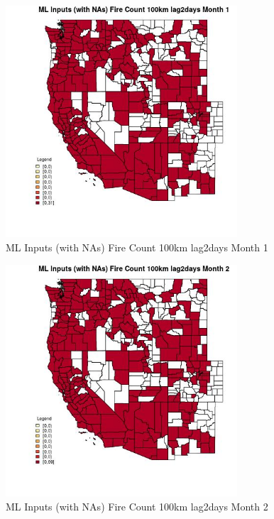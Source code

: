 \clearpage 

\begin{figure} 
\centering  
\includegraphics[width=0.77\textwidth]{Code_Outputs/Report_ML_input_PM25_Step4_part_e_de_duplicated_aves_compiled_2019-05-21wNAs_CountyFire_Count_100km_lag2daysmedianMonth1.jpg} 
\caption{\label{fig:Report_ML_input_PM25_Step4_part_e_de_duplicated_aves_compiled_2019-05-21wNAsCountyFire_Count_100km_lag2daysmedianMonth1}ML Inputs (with NAs) Fire Count 100km lag2days Month 1} 
\end{figure} 
 

\begin{figure} 
\centering  
\includegraphics[width=0.77\textwidth]{Code_Outputs/Report_ML_input_PM25_Step4_part_e_de_duplicated_aves_compiled_2019-05-21wNAs_CountyFire_Count_100km_lag2daysmedianMonth2.jpg} 
\caption{\label{fig:Report_ML_input_PM25_Step4_part_e_de_duplicated_aves_compiled_2019-05-21wNAsCountyFire_Count_100km_lag2daysmedianMonth2}ML Inputs (with NAs) Fire Count 100km lag2days Month 2} 
\end{figure} 
 

